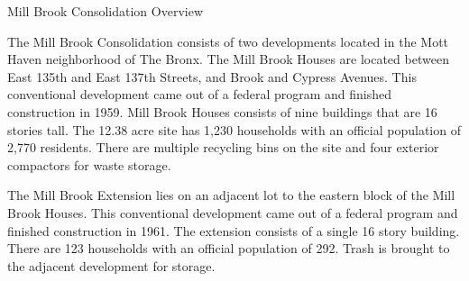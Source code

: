 Mill Brook Consolidation Overview

The Mill Brook Consolidation consists of two developments located in the Mott Haven neighborhood of The Bronx. The Mill Brook Houses are located between East 135th and East 137th Streets, and Brook and Cypress Avenues. This conventional development came out of a federal program and finished construction in 1959. Mill Brook Houses consists of nine buildings that are 16 stories tall. The 12.38 acre site has 1,230 households with an official population of 2,770 residents. There are multiple recycling bins on the site and four exterior compactors for waste storage.

The Mill Brook Extension lies on an adjacent lot to the eastern block of the Mill Brook Houses. This conventional development came out of a federal program and finished construction in 1961. The extension consists of  a single 16 story building. There are 123 households with an official population of 292.  Trash is brought to the adjacent development for storage.